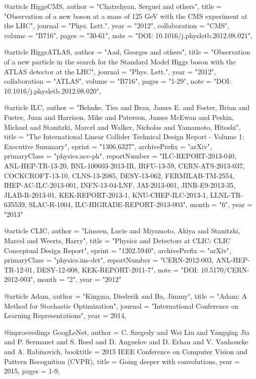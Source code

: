 @article{
	HiggsCMS,
    author  = "Chatrchyan, Serguei and others",
    title   = "Observation of a new boson at a mass of 125 GeV with the CMS experiment at the LHC",
    journal = "Phys. Lett.",
    year    = "2012",
    collaboration   = "CMS",
    volume  = "B716",
    pages   = "30-61",
    note    = "DOI: 10.1016/j.physletb.2012.08.021",
}

@article{
	HiggsATLAS,
    author  = "Aad, Georges and others",
    title   = "Observation of a new particle in the search for the Standard Model Higgs boson with the ATLAS detector at the LHC",
    journal = "Phys. Lett.",
    year    = "2012",
    collaboration   = "ATLAS",
    volume  = "B716",
    pages   = "1-29",
    note    = "DOI: 10.1016/j.physletb.2012.08.020",
}

@article{
    ILC,
    author  = "Behnke, Ties and Brau, James E. and Foster, Brian and Fuster, Juan and Harrison, Mike and Paterson, James McEwan and Peskin, Michael and Stanitzki, Marcel and Walker, Nicholas and Yamamoto, Hitoshi",
    title   = "{The International Linear Collider Technical Design Report - Volume 1: Executive Summary}",
    eprint  = "1306.6327",
    archivePrefix   = "arXiv",
    primaryClass    = "physics.acc-ph",
    reportNumber    = "ILC-REPORT-2013-040, ANL-HEP-TR-13-20, BNL-100603-2013-IR, IRFU-13-59, CERN-ATS-2013-037, COCKCROFT-13-10, CLNS-13-2085, DESY-13-062, FERMILAB-TM-2554, IHEP-AC-ILC-2013-001, INFN-13-04-LNF, JAI-2013-001, JINR-E9-2013-35, JLAB-R-2013-01, KEK-REPORT-2013-1, KNU-CHEP-ILC-2013-1, LLNL-TR-635539, SLAC-R-1004, ILC-HIGRADE-REPORT-2013-003",
    month   = "6",
    year    = "2013"
}

@article{
    CLIC,
    author  = "Linssen, Lucie and Miyamoto, Akiya and Stanitzki, Marcel and Weerts, Harry",
    title   = "{Physics and Detectors at CLIC: CLIC Conceptual Design Report}",
    eprint  = "1202.5940",
    archivePrefix   = "arXiv",
    primaryClass    = "physics.ins-det",
    reportNumber    = "CERN-2012-003, ANL-HEP-TR-12-01, DESY-12-008, KEK-REPORT-2011-7",
    note = "DOI: 10.5170/CERN-2012-003",
    month   = "2",
    year    = "2012"
}

@article{
    Adam,
    author  = "Kingma, Diederik and Ba, Jimmy",
    title   = "Adam: A Method for Stochastic Optimization",
    journal = "International Conference on Learning Representations",
    year    = 2014,
}

@inproceedings{
	GoogLeNet,
    author  = {C. {Szegedy} and  {Wei Liu} and  {Yangqing Jia} and P. {Sermanet} and S. {Reed} and D. {Anguelov} and D. {Erhan} and V. {Vanhoucke} and A. {Rabinovich}},
    booktitle   = {2015 IEEE Conference on Computer Vision and Pattern Recognition (CVPR)}, 
    title   = {Going deeper with convolutions}, 
    year    = {2015},
    pages   = {1-9},
}

